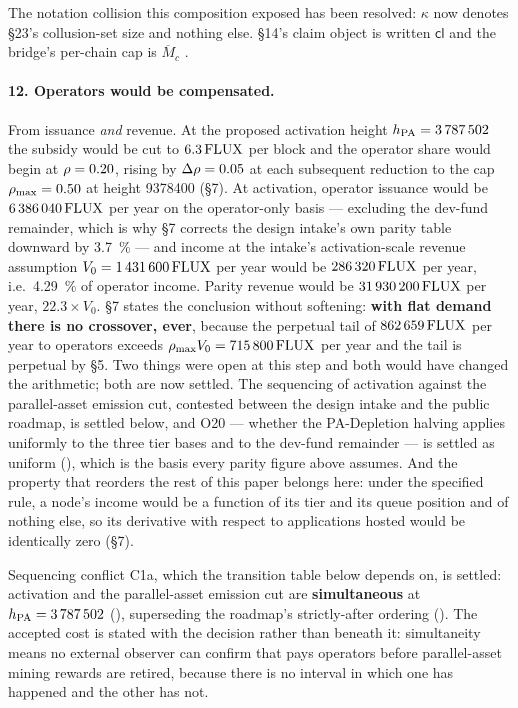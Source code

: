 The notation collision this composition exposed has been resolved: $\kappa$ now denotes \S23's collusion-set size and nothing else. \S14's claim object is written $\mathsf{cl}$ and the bridge's per-chain cap is $\overline{M}_c$ .

\paragraph{12. Operators would be compensated.}
From issuance \emph{and} revenue. At the proposed activation height $h_{\mathrm{PA}} = \num{3787502}$ the
subsidy would be cut to $6.3\,\mathrm{FLUX}$ per block and the operator share would begin at
$\rho = 0.20$, rising by $\Delta\rho = 0.05$ at each subsequent reduction to the cap
$\rho_{\max} = 0.50$ at height \num{9378400} (\S7). At activation, operator issuance would be
$\num{6386040}\,\mathrm{FLUX}$ per year on the operator-only basis --- excluding the dev-fund remainder, which
is why \S7 corrects the design intake's own parity table downward by \SI{3.7}{\percent} --- and \PNR
income at the intake's activation-scale revenue assumption $V_0 = \num{1431600}\,\mathrm{FLUX}$ per year would
be $\num{286320}\,\mathrm{FLUX}$ per year, i.e.\ \SI{4.29}{\percent} of operator income. Parity revenue would
be $\num{31930200}\,\mathrm{FLUX}$ per year, $22.3\times V_0$. \S7 states the conclusion without softening:
\textbf{with flat demand there is no crossover, ever}, because the perpetual tail of
$\num{862659}\,\mathrm{FLUX}$ per year to operators exceeds $\rho_{\max} V_0 = \num{715800}\,\mathrm{FLUX}$ per year
and the tail is perpetual by \S5. Two things were open at this step and both would have changed the
arithmetic; both are now settled. The sequencing of \PNR activation against the parallel-asset
emission cut, contested between the design intake and the public roadmap, is settled below, and O20
--- whether the PA-Depletion halving applies uniformly to the three tier bases and to the dev-fund
remainder --- is settled as uniform (), which is the basis every parity
figure above assumes. And the property that reorders the rest of this paper belongs here:
under the specified rule, a node's \PNR income would be a function of its tier and its queue position
and of nothing else, so its derivative with respect to applications hosted would be identically zero
(\S7).

Sequencing conflict C1a, which the transition table below depends on, is settled: \PNR{} activation
and the parallel-asset emission cut are \textbf{simultaneous} at $h_{\mathrm{PA}} = \num{3787502}$
 (\planned), superseding the roadmap's strictly-after
ordering (). The accepted cost is stated with the decision rather than beneath
it: simultaneity means no external observer can confirm that \PNR{} pays operators before
parallel-asset mining rewards are retired, because there is no interval in which one has happened and
the other has not.

